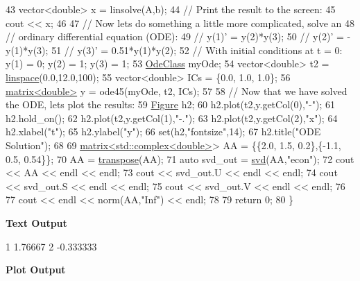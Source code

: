 \begin{DoxyCodeInclude}
43     vector<double> x = linsolve(A,b);
44     \textcolor{comment}{// Print the result to the screen:}
45     cout << x;
46 
47     \textcolor{comment}{// Now lets do something a little more complicated, solve an}
48     \textcolor{comment}{// ordinary differential equation (ODE):}
49     \textcolor{comment}{// y(1)' = y(2)*y(3);}
50     \textcolor{comment}{// y(2)' = -y(1)*y(3);}
51     \textcolor{comment}{// y(3)' = 0.51*y(1)*y(2);}
52     \textcolor{comment}{// With initial conditions at t = 0: y(1) = 0; y(2) = 1; y(3) = 1;}
53     \hyperlink{class_ode_class}{OdeClass} myOde;
54     vector<double> t2 = \hyperlink{namespacekeycpp_ab57eee495c93eb18ebf8c8ccf4d44e74}{linspace}(0.0,12.0,100);
55     vector<double> ICs = \{0.0, 1.0, 1.0\};
56     \hyperlink{classkeycpp_1_1matrix}{matrix<double>} y = ode45(myOde, t2, ICs);
57     
58     \textcolor{comment}{// Now that we have solved the ODE, lets plot the results:}
59     \hyperlink{classkeycpp_1_1_figure}{Figure} h2;
60     h2.plot(t2,y.getCol(0),\textcolor{stringliteral}{"-"});
61     h2.hold\_on();
62     h2.plot(t2,y.getCol(1),\textcolor{stringliteral}{"-."});
63     h2.plot(t2,y.getCol(2),\textcolor{stringliteral}{"x"});
64     h2.xlabel(\textcolor{stringliteral}{"t"});
65     h2.ylabel(\textcolor{stringliteral}{"y"});
66     \textcolor{keyword}{set}(h2,\textcolor{stringliteral}{"fontsize"},14);
67     h2.title(\textcolor{stringliteral}{"ODE Solution"});
68     
69     \hyperlink{classkeycpp_1_1matrix}{matrix<std::complex<double>}> AA = \{\{2.0, 1.5, 0.2\},\{-1.1, 0.5, 0.54\}\};
70     AA = \hyperlink{namespacekeycpp_ad68697505d1a1a85f30a18b0e9b0eb2f}{transpose}(AA);
71     \textcolor{keyword}{auto} svd\_out = \hyperlink{namespacekeycpp_a4b80bd145aab03a9e79a42d32ca573bd}{svd}(AA,\textcolor{stringliteral}{"econ"});
72     cout << AA << endl << endl;
73     cout << svd\_out.U << endl << endl;
74     cout << svd\_out.S << endl << endl;
75     cout << svd\_out.V << endl << endl;
76     
77     cout << endl << norm(AA,\textcolor{stringliteral}{"Inf"}) << endl;
78 
79     \textcolor{keywordflow}{return} 0;
80 \}
\end{DoxyCodeInclude}
 \par
 {\bfseries {\ttfamily Text} Output} 
\begin{DoxyCodeInclude}
1 1.76667
2 -0.333333
\end{DoxyCodeInclude}
 \par
 {\bfseries {\ttfamily Plot} Output}  \par
  \par


